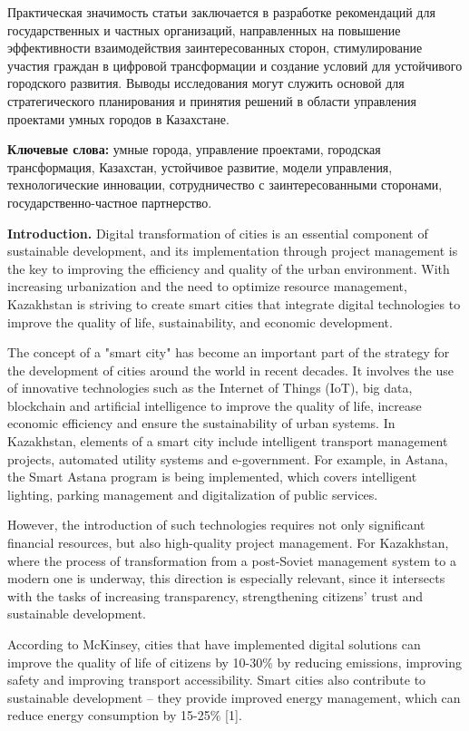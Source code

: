{Практическая значимость статьи заключается в разработке рекомендаций для
государственных и частных организаций, направленных на повышение
эффективности взаимодействия заинтересованных сторон, стимулирование
участия граждан в цифровой трансформации и создание условий для
устойчивого городского развития. Выводы исследования могут служить
основой для стратегического планирования и принятия решений в области
управления проектами умных городов в Казахстане.

{\bfseries Ключевые слова:} умные города, управление проектами, городская
трансформация, Казахстан, устойчивое развитие, модели управления,
технологические инновации, сотрудничество с заинтересованными сторонами,
государственно-частное партнерство.

{\bfseries Introduction.} Digital transformation of cities is an essential
component of sustainable development, and its implementation through
project management is the key to improving the efficiency and quality of
the urban environment. With increasing urbanization and the need to
optimize resource management, Kazakhstan is striving to create smart
cities that integrate digital technologies to improve the quality of
life, sustainability, and economic development.

The concept of a "smart city" has become an important part of the
strategy for the development of cities around the world in recent
decades. It involves the use of innovative technologies such as the
Internet of Things (IoT), big data, blockchain and artificial
intelligence to improve the quality of life, increase economic
efficiency and ensure the sustainability of urban systems. In
Kazakhstan, elements of a smart city include intelligent transport
management projects, automated utility systems and e-government. For
example, in Astana, the Smart Astana program is being implemented, which
covers intelligent lighting, parking management and digitalization of
public services.

However, the introduction of such technologies requires not only
significant financial resources, but also high-quality project
management. For Kazakhstan, where the process of transformation from a
post-Soviet management system to a modern one is underway, this
direction is especially relevant, since it intersects with the tasks of
increasing transparency, strengthening citizens'{} trust
and sustainable development.

According to McKinsey, cities that have implemented digital solutions
can improve the quality of life of citizens by 10-30\% by reducing
emissions, improving safety and improving transport accessibility. Smart
cities also contribute to sustainable development -- they provide
improved energy management, which can reduce energy consumption by
15-25\% {[}1{]}.

}
